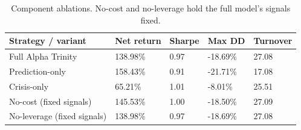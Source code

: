 \begin{table}[htbp]
\caption{Component ablations. No-cost and no-leverage hold the full model's signals fixed.}
\label{tab:ablations}
\begin{tabular}{lllll}
\toprule
Strategy / variant & Net return & Sharpe & Max DD & Turnover \\
\midrule
Full Alpha Trinity & 138.98\% & 0.97 & -18.69\% & 27.08 \\
Prediction-only & 158.43\% & 0.91 & -21.71\% & 17.08 \\
Crisis-only & 65.21\% & 1.01 & -8.01\% & 25.51 \\
No-cost (fixed signals) & 145.53\% & 1.00 & -18.50\% & 27.09 \\
No-leverage (fixed signals) & 138.98\% & 0.97 & -18.69\% & 27.08 \\
\bottomrule
\end{tabular}
\end{table}
